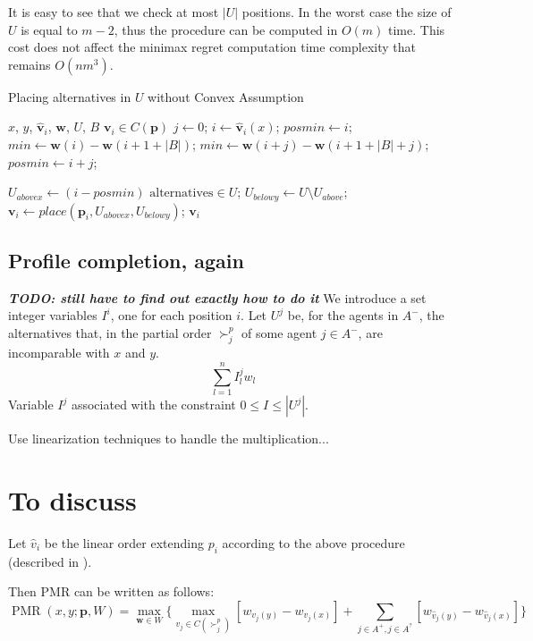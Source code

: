 \documentclass[12pt]{article}
\newcommand{\profile}{\textbf{v}}%
\newcommand{\pprofile}{\textbf{p}}%
\newcommand{\w}{\textbf{w}}%
\DeclareMathOperator{\PMR}{PMR}
\begin{document}
It is easy to see that we check at most $|U|$ positions. In the worst case the size of $U$ is equal to $m-2$, thus the procedure can be computed in $O(m)$ time. This cost does not affect the minimax regret computation time complexity that remains $O(nm^3)$.

\begin{algorithm}[h] 
	\caption{Placing alternatives in $U$ without Convex Assumption}
	\label{alg:splittingU} 
	\begin{algorithmic}
		\Require $x$, $y$, $\hat{\profile}_i$, $\w$, $U$, $B$
		\Ensure $\profile_i \in C(\pprofile)$
		\Statex
		\State $ j \gets 0$;
		\State $ i \gets \hat{\profile}_i(x)$;
		\State $ \mathit{posmin} \gets i$;
		\State $ \mathit{min} \gets \w(i) - \w(i+1+|B|)$;
		\If{ $(\w(i+j)-\w(i+1+|B|+j) < \mathit{min})$ }
		\State $ \mathit{min} \gets \w(i+j) - \w(i+1+|B|+j)$;
		\State $ \mathit{posmin} \gets i+j$;
		\EndIf
		\EndWhile
		
		\State $U_{\mathit{abovex}} \gets (i-\mathit{posmin}) \text{ alternatives} \in U $;
		\State $U_{\mathit{belowy}} \gets U \setminus U_{\mathit{above}}$;
		\Statex
		\State $\profile_i \gets place(\pprofile_i,U_{\mathit{abovex}},U_{\mathit{belowy}})$;
		\Statex \Return $\profile_i$
		
	\end{algorithmic}
\end{algorithm}

\subsection{Profile completion, again}
 {\bf \em TODO: still have to find out exactly how to do it}
 We introduce a set integer variables $I^i$, one for each position $i$.
 Let $U^j$ be, for the agents in $A^-$, the alternatives that, in the partial order $\succ^p_j$ of some agent $j \in A^-$, are incomparable with $x$ and $y$.
 \[ \sum_{l=1}^n I^j_l w_l \]
 Variable $I^j$ associated with the constraint $0 \leq I \leq |U^j|$.
 
 Use linearization techniques to handle the multiplication...

\section{To discuss}
Let $\hat{v}_i$ be the linear order extending $p_i$ according to the above procedure (described in \cite{Lu2011}).


Then PMR can be written as follows:
\[ \PMR(x,y; \pprofile, W) = \max_{\w \in W} \Big \{ \max_{v_j \in C(\succ_j^p)} [w_{v_j(y)} - w_{v_j(x)}]  + \sum_{j \in A^+, j \in A^?} [w_{\hat{v}_j(y)} - w_{\hat{v}_j(x)}] \Big \} \]
\end{document}
